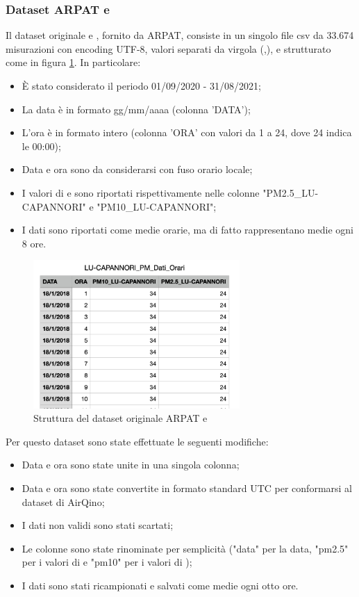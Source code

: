 \subsubsection{Dataset ARPAT  e }
Il dataset originale  e , fornito da ARPAT, consiste in un singolo file csv da 33.674 misurazioni con encoding UTF-8, valori separati da virgola (,), e strutturato come in figura \ref{fig:pm-arpat}. In particolare:
\begin{itemize}
  \item È stato considerato il periodo 01/09/2020 - 31/08/2021;
  \item La data è in formato gg/mm/aaaa (colonna 'DATA');
  \item L'ora è in formato intero (colonna 'ORA' con valori da 1 a 24, dove 24 indica le 00:00);
  \item Data e ora sono da considerarsi con fuso orario locale;
  \item I valori di  e  sono riportati rispettivamente nelle colonne "PM2.5\_LU-CAPANNORI" e "PM10\_LU-CAPANNORI";
  \item I dati sono riportati come medie orarie, ma di fatto rappresentano medie ogni 8 ore.
\end{itemize}

\begin{figure}[H]
\centering
\captionsetup{justification=centering}
\includegraphics[width=0.7\textwidth,height=\textheight,keepaspectratio]{img/dataset_arpat_pm_prima.png}
\caption{Struttura del dataset originale ARPAT  e }
\label{fig:pm-arpat}
\end{figure}

Per questo dataset sono state effettuate le seguenti modifiche:
\begin{itemize}
  \item Data e ora sono state unite in una singola colonna;
  \item Data e ora sono state convertite in formato standard UTC per conformarsi al dataset di AirQino;
  \item I dati non validi sono stati scartati;
  \item Le colonne sono state rinominate per semplicità ("data" per la data, "pm2.5" per i valori di  e "pm10" per i valori di );
  \item I dati sono stati ricampionati e salvati come medie ogni otto ore.\\
\end{itemize}

